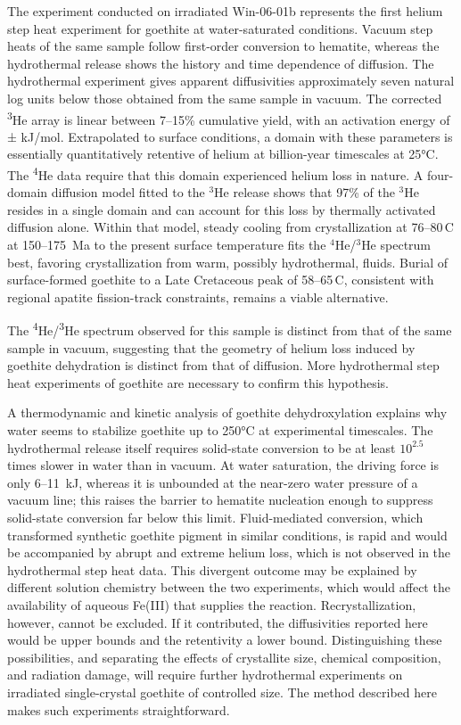 The experiment conducted on irradiated Win-06-01b represents the first helium step heat experiment for goethite at water-saturated conditions. 
Vacuum step heats of the same sample follow first-order conversion to hematite, whereas the hydrothermal release shows the history and time
dependence of diffusion. The hydrothermal experiment gives apparent
diffusivities approximately seven natural log units below those obtained
from the same sample in vacuum. The corrected \textsuperscript{3}He array is linear between
7--15\% cumulative yield, with an activation energy of \ChTwoEa ±
\ChTwoEaErr kJ/mol. Extrapolated to surface conditions, a domain with these
parameters is essentially quantitatively retentive of helium at
billion-year timescales at 25°C. The \textsuperscript{4}He data require that this domain
experienced helium loss in nature. A four-domain diffusion model fitted to the $^3$He release
shows that 97\% of the $^3$He resides in a single domain and can account for this loss by
thermally activated diffusion alone. Within that model, steady cooling from crystallization at
76--80\,\textdegree C at 150--175~Ma to the present surface temperature fits the
$^4$He/$^3$He spectrum best, favoring crystallization from warm, possibly hydrothermal, fluids.
Burial of surface-formed goethite to a Late Cretaceous peak of 58--65\,\textdegree C, consistent
with regional apatite fission-track constraints, remains a viable alternative.

The \textsuperscript{4}He/\textsuperscript{3}He spectrum observed for this sample is distinct from that of the
same sample in vacuum, suggesting that the geometry of helium loss induced
by goethite dehydration is distinct from that of diffusion. More
hydrothermal step heat experiments of goethite are necessary to confirm
this hypothesis.

A thermodynamic and kinetic analysis of goethite dehydroxylation explains why water seems to stabilize goethite up to 250°C
at experimental timescales. The hydrothermal release itself requires solid-state conversion to be at least
$10^{2.5}$ times slower in water than in vacuum. At water saturation, the driving force is only 6--11~kJ, whereas it is unbounded at the near-zero
water pressure of a vacuum line; this raises the barrier to hematite nucleation enough to suppress solid-state conversion
far below this limit. Fluid-mediated
conversion, which transformed synthetic goethite pigment in similar conditions, is rapid and would be accompanied by abrupt and extreme helium loss, which is not observed in the hydrothermal step heat data.
This divergent outcome may be explained by different solution chemistry between the two experiments, which would affect the 
availability of aqueous Fe(III) that supplies the reaction.
Recrystallization, however, cannot be excluded.
If it contributed, the diffusivities reported here would be upper
bounds and the retentivity a lower bound. Distinguishing these
possibilities, and separating the effects of crystallite size, chemical
composition, and radiation damage, will require further hydrothermal
experiments on irradiated single-crystal goethite of controlled size. The
method described here makes such experiments straightforward.
